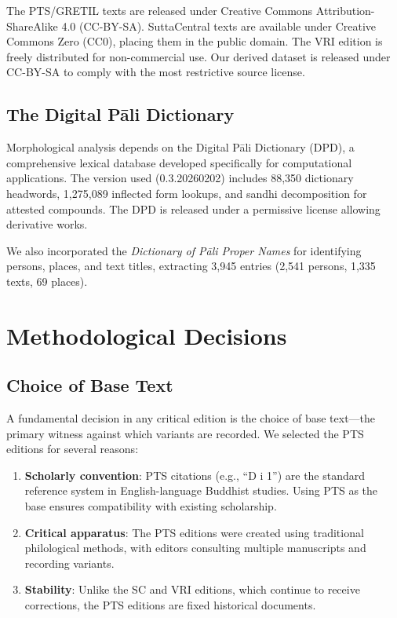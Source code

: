 \documentclass[12pt]{article}
\begin{document}
The PTS/GRETIL texts are released under Creative Commons Attribution-ShareAlike 4.0 (CC-BY-SA). SuttaCentral texts are available under Creative Commons Zero (CC0), placing them in the public domain. The VRI edition is freely distributed for non-commercial use. Our derived dataset is released under CC-BY-SA to comply with the most restrictive source license.

\subsection{The Digital Pāli Dictionary}

Morphological analysis depends on the Digital Pāli Dictionary (DPD), a comprehensive lexical database developed specifically for computational applications. The version used (0.3.20260202) includes 88,350 dictionary headwords, 1,275,089 inflected form lookups, and sandhi decomposition for attested compounds. The DPD is released under a permissive license allowing derivative works.

We also incorporated the \textit{Dictionary of Pāli Proper Names} \citep{malalasekera1937} for identifying persons, places, and text titles, extracting 3,945 entries (2,541 persons, 1,335 texts, 69 places).

\section{Methodological Decisions}

\subsection{Choice of Base Text}

A fundamental decision in any critical edition is the choice of base text---the primary witness against which variants are recorded. We selected the PTS editions for several reasons:

\begin{enumerate}
\item \textbf{Scholarly convention}: PTS citations (e.g., ``D i 1'') are the standard reference system in English-language Buddhist studies. Using PTS as the base ensures compatibility with existing scholarship.

\item \textbf{Critical apparatus}: The PTS editions were created using traditional philological methods, with editors consulting multiple manuscripts and recording variants.

\item \textbf{Stability}: Unlike the SC and VRI editions, which continue to receive corrections, the PTS editions are fixed historical documents.
\end{enumerate}
\end{document}
